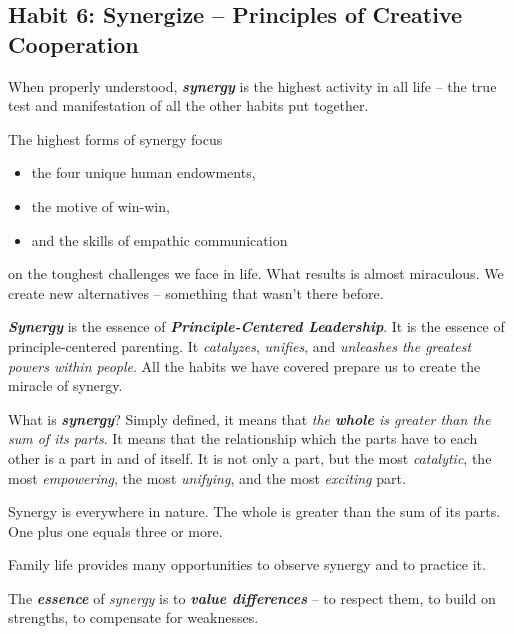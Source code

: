\documentclass[11pt]{article}
\begin{document}
\subsection{Habit 6: Synergize -- Principles of Creative Cooperation}
When properly understood, \emph{\textbf{synergy}} is the highest activity in all life -- the true test and manifestation of all the other habits put together.

The highest forms of synergy focus 
\begin{itemize}
\item the four unique human endowments, 
\item the motive of win-win, 
\item and the skills of empathic communication 
\end{itemize} on the toughest challenges we face in life. 
What results is almost miraculous. We create new alternatives -- something that wasn't there before.

\emph{\textbf{Synergy}} is the essence of \emph{\textbf{Principle-Centered Leadership}}. It is the essence of principle-centered parenting. It \emph{catalyzes}, \emph{unifies}, and \emph{unleashes the greatest powers within people}. All the habits we have covered prepare us to create the miracle of synergy.

What is \emph{\textbf{synergy}}? Simply defined, it means that \emph{the \textbf{whole} is greater than the sum of its parts}. It means that the relationship which the parts have to each other is a part in and of itself. It is not only a part, but the most \emph{catalytic}, the most \emph{empowering}, the most \emph{unifying}, and the most \emph{exciting} part.

Synergy is everywhere in nature. The whole is greater than the sum of its parts. One plus one equals three or more.

Family life provides many opportunities to observe synergy and to practice it. 

The \emph{\textbf{essence}} of \emph{synergy} is to \emph{\textbf{value differences}} -- to respect them, to build on strengths, to compensate for weaknesses.
\end{document}
